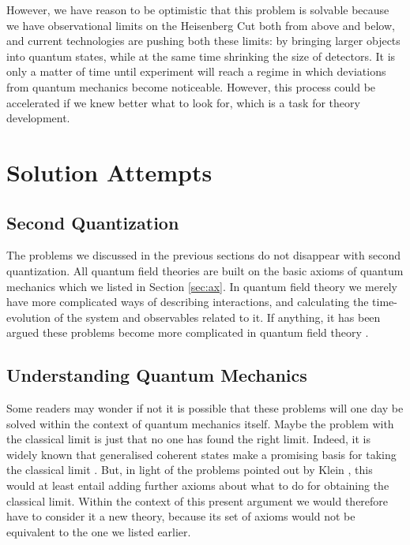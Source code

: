 \documentclass[superscriptaddress,floatfix,nofootinbib,12pt]{revtex4-2}
\begin{document}
However, we have reason to be optimistic that this problem is solvable because we have observational limits on the Heisenberg Cut both from above and below, and current technologies are pushing both these limits: by bringing larger objects into quantum states, while at the same time shrinking the size of detectors. It is only a matter of time until experiment will reach a regime in which deviations from quantum mechanics become noticeable. However, this process could be accelerated if we knew better what to look for, which is a task for theory development. 

\section{Solution Attempts}

\subsection{Second Quantization}

 The problems we discussed in the previous sections do not disappear with second quantization. All quantum field theories are built on the basic axioms of quantum mechanics which we listed in Section \ref{sec:ax}. In quantum field theory we merely have more complicated ways of describing interactions, and calculating the time-evolution of the system and observables related to it. If anything, it has been argued these problems become more complicated in quantum field theory \cite{grimmer2022pragmatic}.
 
 \subsection{Understanding Quantum Mechanics}
 
 Some readers may wonder if not it is possible that these problems will one day be solved within the context of quantum mechanics itself. Maybe the problem with the classical limit is just that no one has found the right limit. Indeed, it is widely known that generalised coherent states make a promising basis for taking the classical limit \cite{yaffe1982large,landsman2006between}. But, in light of the problems pointed out by Klein \cite{klein2011limit}, this would at least entail adding further axioms about what to do for obtaining the classical limit. Within the context of this present argument we would therefore have to consider it a new theory, because its set of axioms would not be equivalent to the one we listed earlier.
 
\end{document}
